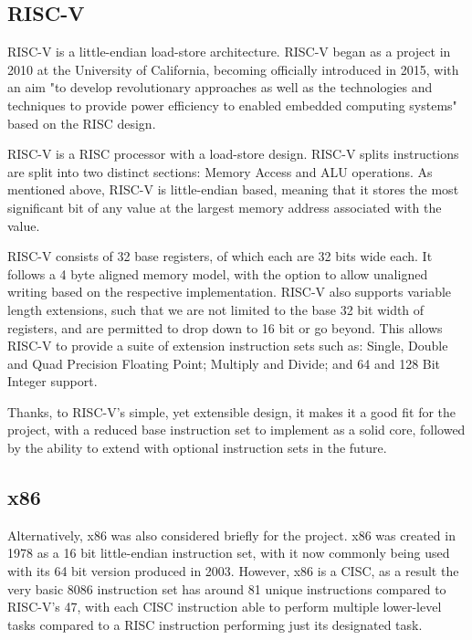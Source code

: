 \subsection{RISC-V}
RISC-V \cite{waterman_2019_the} is a little-endian load-store architecture. RISC-V began as a project in 2010 at the University of California, becoming officially introduced in 2015, with an aim "to develop revolutionary approaches as well as the technologies and techniques to provide power efficiency to enabled embedded computing systems" \cite{riscvinternational_2018_history} based on the \ac{RISC} design.

RISC-V is a \ac{RISC} processor with a load-store design. RISC-V splits instructions are split into two distinct sections: Memory Access and \ac{ALU} operations. As mentioned above, RISC-V is little-endian based, meaning that it stores the most significant bit of any value at the largest memory address associated with the value.

RISC-V consists of 32 base registers, of which each are 32 bits wide each. It follows a 4 byte aligned memory model, with the option to allow unaligned writing based on the respective implementation. RISC-V also supports variable length extensions, such that we are not limited to the base 32 bit width of registers, and are permitted to drop down to 16 bit or go beyond. This allows RISC-V to provide a suite of extension instruction sets such as: Single, Double and Quad Precision Floating Point; Multiply and Divide; and 64 and 128 Bit Integer support.

Thanks, to RISC-V's simple, yet extensible design, it makes it a good fit for the project, with a reduced base instruction set to implement as a solid core, followed by the ability to extend with optional instruction sets in the future.

\subsection{x86}
Alternatively, x86 was also considered briefly for the project. x86 \cite{intelcorporation_2023_intel} was created in 1978 as a 16 bit little-endian instruction set, with it now commonly being used with its 64 bit version produced in 2003. However, x86 is a \ac{CISC}, as a result the very basic 8086 \cite{amd_1989_8086} instruction set has around 81 unique instructions compared to RISC-V's 47, with each \ac{CISC} instruction able to perform multiple lower-level tasks compared to a \ac{RISC} instruction performing just its designated task.

